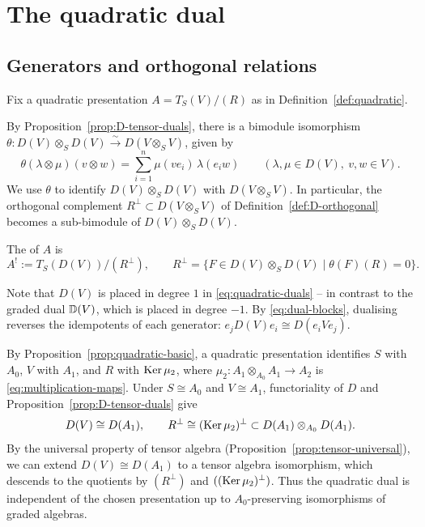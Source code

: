 \section{The quadratic dual}\label{sec:quadratic-dual}

\subsection{Generators and orthogonal relations}

Fix a quadratic presentation $A=T_S(V)/(R)$ as in Definition~\ref{def:quadratic}.


By Proposition~\ref{prop:D-tensor-duals}, there is a bimodule isomorphism $\theta:D(V)\otimes_S D(V)\xrightarrow{\sim}D(V\otimes_S V)$, given by
\[
\theta(\lambda\otimes\mu)(v\otimes w)=\sum_{i=1}^n\mu(ve_i)\,\lambda(e_iw)
\qquad(\lambda,\mu\in D(V),\ v,w\in V).
\]
We use $\theta$ to identify $D(V)\otimes_S D(V)$ with $D(V\otimes_S V)$.
In particular, the orthogonal complement $R^\perp\subset D(V\otimes_S V)$ of Definition~\ref{def:D-orthogonal} becomes a sub-bimodule of $D(V)\otimes_S D(V)$.

\begin{definition}\label{def:quadratic-duals}
The  of $A$ is
\begin{equation}\label{eq:quadratic-duals}
A^!:=T_S(D(V))/(R^\perp),
\qquad
R^\perp=\{F\in D(V)\otimes_S D(V)\mid\theta(F)(R)=0\}.
\end{equation}
\end{definition}

Note that $D(V)$ is placed in degree $1$ in \eqref{eq:quadratic-duals} -- in contrast to the graded dual $\mathbb{D}(V)$, which is placed in degree $-1$.
By \eqref{eq:dual-blocks}, dualising reverses the idempotents of each generator: $e_jD(V)e_i\cong D(e_iVe_j)$.

By Proposition~\ref{prop:quadratic-basic}, a quadratic presentation identifies $S$ with $A_0$, $V$ with $A_1$, and $R$ with $\operatorname{Ker}\nolimits\mu_2$, where $\mu_2:A_1\otimes_{A_0}A_1\to A_2$ is \eqref{eq:multiplication-maps}.
Under $S\cong A_0$ and $V\cong A_1$, functoriality of $D$ and Proposition~\ref{prop:D-tensor-duals} give
\[
D(V)\cong D(A_1),\qquad
R^\perp\cong(\operatorname{Ker}\nolimits\mu_2)^\perp\subset D(A_1)\otimes_{A_0}D(A_1).
\]
By the universal property of tensor algebra (Proposition~\ref{prop:tensor-universal}), we can extend $D(V)\cong D(A_1)$ to a tensor algebra isomorphism, which descends to the quotients by $(R^\perp)$ and $((\operatorname{Ker}\nolimits\mu_2)^\perp)$.
Thus the quadratic dual is independent of the chosen presentation up to $A_0$-preserving isomorphisms of graded algebras.



